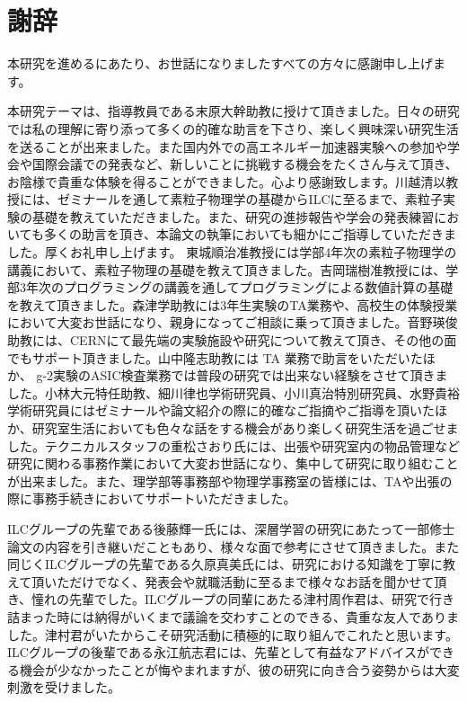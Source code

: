 
\clearpage

\chapter*{謝辞} \label{sec:Acknowledgement}
本研究を進めるにあたり、お世話になりましたすべての方々に感謝申し上げます。

本研究テーマは、指導教員である末原大幹助教に授けて頂きました。日々の研究では私の理解に寄り添って多くの的確な助言を下さり、楽しく興味深い研究生活を送ることが出来ました。また国内外での高エネルギー加速器実験への参加や学会や国際会議での発表など、新しいことに挑戦する機会をたくさん与えて頂き、お陰様で貴重な体験を得ることができました。心より感謝致します。川越清以教授には、ゼミナールを通して素粒子物理学の基礎からILCに至るまで、素粒子実験の基礎を教えていただきました。また、研究の進捗報告や学会の発表練習においても多くの助言を頂き、本論文の執筆においても細かにご指導していただきました。厚くお礼申し上げます。
東城順治准教授には学部4年次の素粒子物理学の講義において、素粒子物理の基礎を教えて頂きました。吉岡瑞樹准教授には、学部3年次のプログラミングの講義を通してプログラミングによる数値計算の基礎を教えて頂きました。森津学助教には3年生実験のTA業務や、高校生の体験授業において大変お世話になり、親身になってご相談に乗って頂きました。音野瑛俊助教には、CERNにて最先端の実験施設や研究について教えて頂き、その他の面でもサポート頂きました。山中隆志助教には TA 業務で助言をいただいたほか、 g-2実験のASIC検査業務では普段の研究では出来ない経験をさせて頂きました。小林大元特任助教、細川律也学術研究員、小川真治特別研究員、水野貴裕学術研究員にはゼミナールや論文紹介の際に的確なご指摘やご指導を頂いたほか、研究室生活においても色々な話をする機会があり楽しく研究生活を過ごせました。テクニカルスタッフの重松さおり氏には、出張や研究室内の物品管理など研究に関わる事務作業において大変お世話になり、集中して研究に取り組むことが出来ました。また、理学部等事務部や物理学事務室の皆様には、TAや出張の際に事務手続きにおいてサポートいただきました。

ILCグループの先輩である後藤輝一氏には、深層学習の研究にあたって一部修士論文の内容を引き継いだこともあり、様々な面で参考にさせて頂きました。また同じくILCグループの先輩である久原真美氏には、研究における知識を丁寧に教えて頂いただけでなく、発表会や就職活動に至るまで様々なお話を聞かせて頂き、憧れの先輩でした。ILCグループの同輩にあたる津村周作君は、研究で行き詰まった時には納得がいくまで議論を交わすことのできる、貴重な友人でありました。津村君がいたからこそ研究活動に積極的に取り組んでこれたと思います。ILCグループの後輩である永江航志君には、先輩として有益なアドバイスができる機会が少なかったことが悔やまれますが、彼の研究に向き合う姿勢からは大変刺激を受けました。

